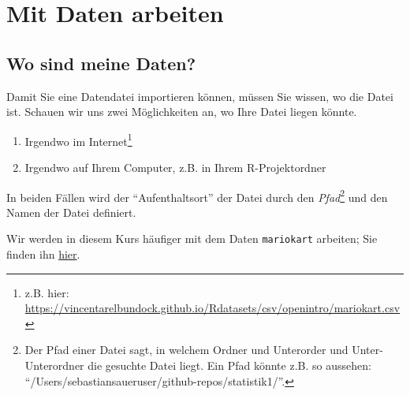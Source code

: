 \documentclass[
  a4paper,
  DIV=11]{scrreprt}
\providecommand{\tightlist}{%
  \setlength{\itemsep}{0pt}\setlength{\parskip}{0pt}}\usepackage{longtable,booktabs,array}
\theoremstyle{definition}
\theoremstyle{definition}
\theoremstyle{definition}
\theoremstyle{remark}
\begin{document}
\section{Mit Daten arbeiten}\label{mit-daten-arbeiten}

\subsection{Wo sind meine Daten?}\label{wo-sind-meine-daten}

Damit Sie eine Datendatei importieren können, müssen Sie wissen, wo die
Datei ist. Schauen wir uns zwei Möglichkeiten an, wo Ihre Datei liegen
könnte.

\begin{enumerate}
\def\labelenumi{\arabic{enumi}.}
\tightlist
\item
  Irgendwo im Internet\footnote{z.B. hier:
    \url{https://vincentarelbundock.github.io/Rdatasets/csv/openintro/mariokart.csv}}
\item
  Irgendwo auf Ihrem Computer, z.B. in Ihrem R-Projektordner
\end{enumerate}

In beiden Fällen wird der ``Aufenthaltsort'' der Datei durch den
\emph{Pfad}\footnote{Der Pfad einer Datei sagt, in welchem Ordner und
  Unterorder und Unter-Unterordner die gesuchte Datei liegt. Ein Pfad
  könnte z.B. so aussehen:
  ``/Users/sebastiansaueruser/github-repos/statistik1/''.} und den Namen
der Datei definiert.

\begin{tcolorbox}[enhanced jigsaw, leftrule=.75mm, opacitybacktitle=0.6, colback=white, colframe=quarto-callout-note-color-frame, coltitle=black, colbacktitle=quarto-callout-note-color!10!white, opacityback=0, left=2mm, breakable, titlerule=0mm, toptitle=1mm, bottomtitle=1mm, rightrule=.15mm, title=\textcolor{quarto-callout-note-color}{\faInfo}\hspace{0.5em}{Hinweis}, arc=.35mm, bottomrule=.15mm, toprule=.15mm]

Wir werden in diesem Kurs häufiger mit dem Daten \texttt{mariokart}
arbeiten; Sie finden ihn
\href{https://vincentarelbundock.github.io/Rdatasets/csv/openintro/mariokart.csv}{hier}.\footnotemark{}

\end{tcolorbox}

\end{document}
